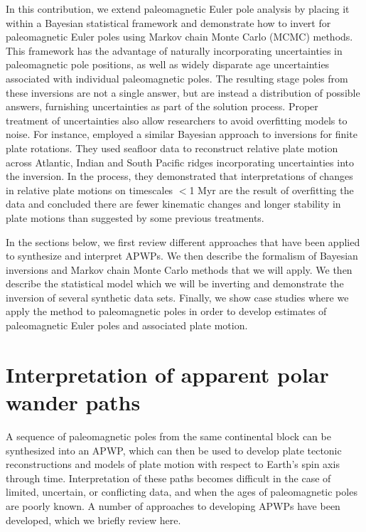 \documentclass[]{agujournal2019}
\begin{document}
In this contribution, we extend paleomagnetic Euler pole analysis by placing it within a Bayesian statistical framework and demonstrate how to invert for paleomagnetic Euler poles using Markov chain Monte Carlo (MCMC) methods. This framework has the advantage of naturally incorporating uncertainties in paleomagnetic pole positions, as well as widely disparate age uncertainties associated with individual paleomagnetic poles. The resulting stage poles from these inversions are not a single answer, but are instead a distribution of possible answers, furnishing uncertainties as part of the solution process. Proper treatment of uncertainties also allow researchers to avoid overfitting models to noise. For instance,  employed a similar Bayesian approach to inversions for finite plate rotations. They used seafloor data to reconstruct relative plate motion across Atlantic, Indian and South Pacific ridges incorporating uncertainties into the inversion. In the process, they demonstrated that interpretations of changes in relative plate motions on timescales $<$1 Myr are the result of overfitting the data and concluded there are fewer kinematic changes and longer stability in plate motions than suggested by some previous treatments.

In the sections below, we first review different approaches that have been applied to synthesize and interpret APWPs. We then describe the formalism of Bayesian inversions and Markov chain Monte Carlo methods that we will apply. We then describe the statistical model which we will be inverting and demonstrate the inversion of several synthetic data sets. Finally, we show case studies where we apply the method to paleomagnetic poles in order to develop estimates of paleomagnetic Euler poles and associated plate motion.

\section*{Interpretation of apparent polar wander paths}

A sequence of paleomagnetic poles from the same continental block can be synthesized into an APWP, which can then be used to develop plate tectonic reconstructions and models of plate motion with respect to Earth's spin axis through time. Interpretation of these paths becomes difficult in the case of limited, uncertain, or conflicting data, and when the ages of paleomagnetic poles are poorly known. A number of approaches to developing APWPs have been developed, which we briefly review here.
\end{document}
